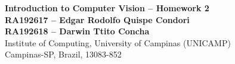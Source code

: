 \documentclass[10pt, a4paper]{article}
\begin{document}
\begin{center}

\textbf{Introduction to Computer Vision -- Homework 2} \\[0.1cm]

\textbf{RA192617 -- Edgar Rodolfo Quispe Condori} \\[0.1cm]
\textbf{RA192618 -- Darwin Ttito Concha} \\[0.1cm]

Institute of Computing, University of Campinas (UNICAMP) \\
Campinas-SP, Brazil, 13083-852 \\
\end{center}





\end{document}
